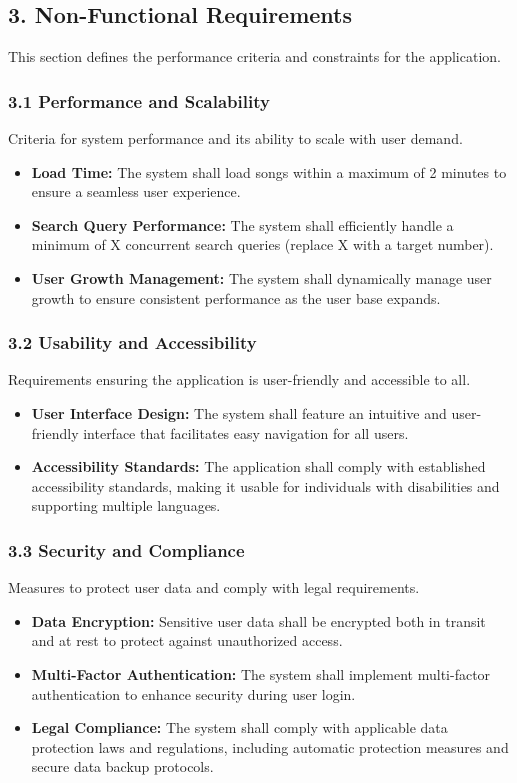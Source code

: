 \documentclass[a4paper,10pt]{article}
\begin{document}
\subsection*{3. Non-Functional Requirements}
This section defines the performance criteria and constraints for the application.

\subsubsection*{3.1 Performance and Scalability}
Criteria for system performance and its ability to scale with user demand.

\begin{itemize}[leftmargin=*]
    \item \textbf{Load Time:} The system shall load songs within a maximum of 2 minutes to ensure a seamless user experience.
    \item \textbf{Search Query Performance:} The system shall efficiently handle a minimum of X concurrent search queries (replace X with a target number).
    \item \textbf{User Growth Management:} The system shall dynamically manage user growth to ensure consistent performance as the user base expands.
\end{itemize}

\subsubsection*{3.2 Usability and Accessibility}
Requirements ensuring the application is user-friendly and accessible to all.

\begin{itemize}[leftmargin=*]
    \item \textbf{User Interface Design:} The system shall feature an intuitive and user-friendly interface that facilitates easy navigation for all users.
    \item \textbf{Accessibility Standards:} The application shall comply with established accessibility standards, making it usable for individuals with disabilities and supporting multiple languages.
\end{itemize}

\subsubsection*{3.3 Security and Compliance}
Measures to protect user data and comply with legal requirements.

\begin{itemize}[leftmargin=*]
    \item \textbf{Data Encryption:} Sensitive user data shall be encrypted both in transit and at rest to protect against unauthorized access.
    \item \textbf{Multi-Factor Authentication:} The system shall implement multi-factor authentication to enhance security during user login.
    \item \textbf{Legal Compliance:} The system shall comply with applicable data protection laws and regulations, including automatic protection measures and secure data backup protocols.
\end{itemize}
\end{document}
